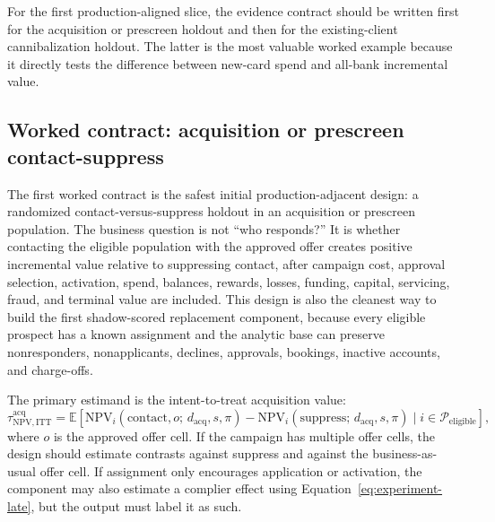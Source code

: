 \documentclass[11pt]{article}
\newcommand{\E}{\mathbb{E}}
\newcommand{\NPV}{\mathrm{NPV}}
\newcommand{\1}{\mathbf{1}}
\begin{document}
For the first production-aligned slice, the evidence contract should be
written first for the acquisition or prescreen holdout and then for the
existing-client cannibalization holdout. The latter is the most valuable
worked example because it directly tests the difference between new-card
spend and all-bank incremental value.

\subsection{Worked contract: acquisition or prescreen contact-suppress}
\label{subsec:worked-acquisition-contract}

The first worked contract is the safest initial production-adjacent design:
a randomized contact-versus-suppress holdout in an acquisition or prescreen
population. The business question is not ``who responds?'' It is whether
contacting the eligible population with the approved offer creates positive
incremental value relative to suppressing contact, after campaign cost,
approval selection, activation, spend, balances, rewards, losses, funding,
capital, servicing, fraud, and terminal value are included. This design is
also the cleanest way to build the first shadow-scored replacement component,
because every eligible prospect has a known assignment and the analytic base
can preserve nonresponders, nonapplicants, declines, approvals, bookings,
inactive accounts, and charge-offs.

The primary estimand is the intent-to-treat acquisition value:
\begin{equation}
  \tau^{\mathrm{acq}}_{\NPV,\mathrm{ITT}}
  =
  \E[
    \NPV_i(\mathrm{contact},o;\,d_{\mathrm{acq}},s,\pi)
    -
    \NPV_i(\mathrm{suppress};\,d_{\mathrm{acq}},s,\pi)
    \mid i\in\mathcal{P}_{\mathrm{eligible}}
  ],
  \label{eq:worked-acq-itt}
\end{equation}
where $o$ is the approved offer cell. If the campaign has multiple offer
cells, the design should estimate contrasts against suppress and against the
business-as-usual offer cell. If assignment only encourages application or
activation, the component may also estimate a complier effect using
Equation~\eqref{eq:experiment-late}, but the output must label it as such.
\end{document}
